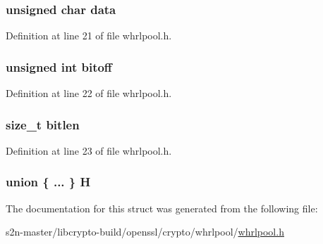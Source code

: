 \subsubsection[{\texorpdfstring{data}{data}}]{\setlength{\rightskip}{0pt plus 5cm}unsigned char data}\hypertarget{struct_w_h_i_r_l_p_o_o_l___c_t_x_ae0325323f2cd409f2185c95bf8f0d4e8}{}\label{struct_w_h_i_r_l_p_o_o_l___c_t_x_ae0325323f2cd409f2185c95bf8f0d4e8}


Definition at line 21 of file whrlpool.\+h.

\subsubsection[{\texorpdfstring{bitoff}{bitoff}}]{\setlength{\rightskip}{0pt plus 5cm}unsigned int bitoff}\hypertarget{struct_w_h_i_r_l_p_o_o_l___c_t_x_a12f585d21042f7d5bd18e794649c886b}{}\label{struct_w_h_i_r_l_p_o_o_l___c_t_x_a12f585d21042f7d5bd18e794649c886b}


Definition at line 22 of file whrlpool.\+h.

\subsubsection[{\texorpdfstring{bitlen}{bitlen}}]{\setlength{\rightskip}{0pt plus 5cm}size\+\_\+t bitlen}\hypertarget{struct_w_h_i_r_l_p_o_o_l___c_t_x_ac114cf8c9f71c2d0bea28144ce11cf6c}{}\label{struct_w_h_i_r_l_p_o_o_l___c_t_x_ac114cf8c9f71c2d0bea28144ce11cf6c}


Definition at line 23 of file whrlpool.\+h.

\subsubsection[{\texorpdfstring{H}{H}}]{\setlength{\rightskip}{0pt plus 5cm}union \{ ... \}   H}\hypertarget{struct_w_h_i_r_l_p_o_o_l___c_t_x_a00b4a40c0906d9e34bc9f2d0df6bcd1b}{}\label{struct_w_h_i_r_l_p_o_o_l___c_t_x_a00b4a40c0906d9e34bc9f2d0df6bcd1b}


The documentation for this struct was generated from the following file\+:\begin{DoxyCompactItemize}
\item 
s2n-\/master/libcrypto-\/build/openssl/crypto/whrlpool/\hyperlink{crypto_2whrlpool_2whrlpool_8h}{whrlpool.\+h}\end{DoxyCompactItemize}
